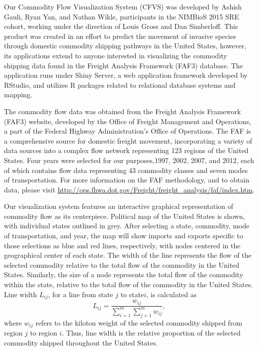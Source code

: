 \documentclass[12pt]{article}
\begin{document}
Our Commodity Flow Visualization System (CFVS) was developed by Ashish Gauli, Ryan Yan, and Nathan Wikle, participants in the NIMBioS 2015 SRE cohort, working under the direction of Louis Gross and Dan Simberloff.  This product was created in an effort to predict the movement of invasive species through domestic commodity shipping pathways in the United States, however, its applications extend to anyone interested in visualizing the commodity shipping data found in the Freight Analysis Framework (FAF3) database.  The application runs under Shiny Server, a web application framework developed by RStudio, and utilizes R packages related to relational database systems and mapping.

The commodity flow data was obtained from the Freight Analysis Framework (FAF3) website, developed by the Office of Freight Management and Operations, a part of the Federal Highway Administration's Office of Operations.  The FAF is a comprehensive source for domestic freight movement, incorporating a variety of data sources into a complex flow network representing 123 regions of the United States.  Four years were selected for our purposes,1997, 2002, 2007, and 2012, each of which contains flow data representing 43 commodity classes and seven modes of transportation.  For more information on the FAF methodology, and to obtain data, please visit \url{http://ops.fhwa.dot.gov/Freight/freight_analysis/faf/index.htm}.

Our visualization system features an interactive graphical representation of commodity flow as its centerpiece. Political map of the United States is shown, with individual states outlined in grey.  After selecting a state, commodity, mode of transportation, and year, the map will show imports and exports specific to those selections as blue and red lines, respectively, with nodes centered in the geographical center of each state.  The width of the line represents the flow of the selected commodity relative to the total flow of the commodity in the United States. Similarly, the size of a node represents the total flow of the commodity within the state, relative to the total flow of the commodity in the United States. Line width $L_{ij}$, for a line from state $j$ to state$i$, is calculated as
\[
L_{ij} = \frac{w_{ij}}{\sum_{i=1}^{m}\sum_{j=1}^{m}w_{ij}}, 
\]
where $w_{ij}$ refers to the kiloton weight of the selected commodity shipped from region $j$ to region $i$.  Thus, line width is the relative proportion of the selected commodity shipped throughout the United States.
\end{document}
